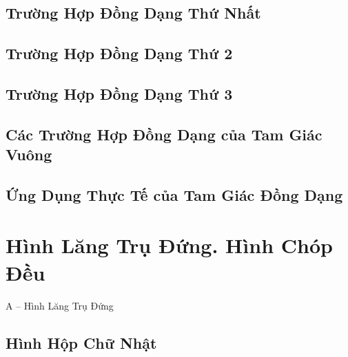 \documentclass{article}
\numberwithin{equation}{section}
\begin{document}

\subsection{Trường Hợp Đồng Dạng Thứ Nhất}


\subsection{Trường Hợp Đồng Dạng Thứ 2}


\subsection{Trường Hợp Đồng Dạng Thứ 3}


\subsection{Các Trường Hợp Đồng Dạng của Tam Giác Vuông}


\subsection{Ứng Dụng Thực Tế của Tam Giác Đồng Dạng}


\section{Hình Lăng Trụ Đứng. Hình Chóp Đều}

\begin{center}
	\Large A -- Hình Lăng Trụ Đứng
\end{center}

\subsection{Hình Hộp Chữ Nhật}
\end{document}
